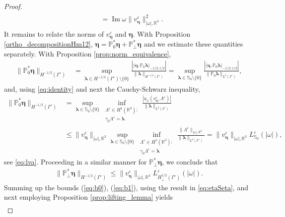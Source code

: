 \documentclass[]{article}
\numberwithin{equation}{section}
\numberwithin{theorem}{section}
\numberwithin{lemma}{section}
\numberwithin{corollary}{section}
\numberwithin{proposition}{section}
\numberwithin{definition}{section}
\newcommand{\re}{\varepsilon}
\renewcommand{\vec}{\boldsymbol}
\renewcommand{\Im}{\operatorname{Im}}
\begin{document}
\begin{proof}
\begin{align}
\begin{split}
				&= \Im \omega  \| v^{\re}_{\vec{\eta}} \|^2_{|\omega|, \mathbb{R}^3}.
			\end{split}
		\end{align}
		It remains to relate the norms of $v^{\re}_{\vec{\eta}}$ and $\vec{\eta}$. With Proposition \ref{ortho_decompositionHm12}, $\vec{\eta} = \mathbb{P}^*_{0} \vec{\eta} + \mathbb{P}^*_{\perp} \vec{\eta}$ and we estimate these quantities separately. With Proposition \ref{prop:norm_equivalence}, 
		\begin{align*}%
			\|\mathbb{P}_0^*\vec{\eta} \|_{H^{-1/2}(\Gamma^{\re})} &=\sup_{\vec{\lambda}\in H^{-1/2}(\Gamma^{\re})\setminus\{0\}}\frac{|\langle  \vec{\eta},\mathbb{P}_0\vec{\lambda}\rangle_{-1/2,1/2}|}{\|\vec{\lambda}\|_{H^{-1/2}(\Gamma^{\re})}}= \sup_{\vec{\lambda}\in \mathbb{S}_0\setminus\{0\}}\frac{|\langle  \vec{\eta},\mathbb{P}_0\vec{\lambda}\rangle_{-1/2,1/2}|}{\|\mathbb{P}_0\vec{\lambda}\|_{L^2(\Gamma^{\re})}}, 
		\end{align*}
		and, using \eqref{eq:identity} and next the Cauchy-Schwarz inequality, 
		\begin{align}%
			\nonumber
			\|\mathbb{P}_0^*\vec{\eta} \|_{H^{-1/2}(\Gamma^{\re})} &=\sup_{\vec{\lambda}\in \mathbb{S}_0\setminus\{0\}}\inf_{\substack{\Lambda^{\re} \in H^1(\mathbb{R}^3): \\  \gamma_0\Lambda^{\re}=\vec{\lambda}}}\frac{|a_{\omega}(v^{\re}_{\vec{\eta}}, \Lambda^{\re})|}{\|\vec{\lambda}\|_{L^2(\Gamma^{\re})}}\\
			\label{eq:b0}
			&\leq \| v^{\re}_{\vec{\eta}} \|_{|\omega|, \mathbb{R}^3} \sup_{\vec{\lambda}\in \mathbb{S}_0\setminus\{0\}}\inf_{\substack{\Lambda^{\re} \in H^1(\mathbb{R}^3): \\  \gamma_0\Lambda^{\re}=\vec{\lambda}}}\frac{\|\Lambda^{\re}\|_{|\omega|,\mathbb{R}^3}}{\|\vec{\lambda}\|_{L^2(\Gamma^{\re})}}=\| v^{\re}_{\vec{\eta}} \|_{|\omega|, \mathbb{R}^3} L^{\re}_{\mathbb{S}_0}(|\omega|),
		\end{align}		
		see \eqref{eq:lva}. Proceeding in a similar manner for $\mathbb{P}_{\perp}^*\vec{\eta}$, we conclude that 
		\begin{align}%
			\label{eq:b1}
			\|\mathbb{P}_{\perp}^*\vec{\eta} \|_{H^{-1/2}(\Gamma^{\re})}\leq \| v^{\re}_{\vec{\eta}} \|_{|\omega|, \mathbb{R}^3} L_{H^{1/2}_{\perp}(\Gamma^{\re})}^{\re}(|\omega|).
		\end{align}
		Summing up the bounds (\eqref{eq:b0}), (\eqref{eq:b1}), using the result in \eqref{eq:etaSeta}, and next employing Proposition \ref{prop:lifting_lemma} yields 
		\begin{align*}

\end{align*}
\end{proof}
\end{document}
